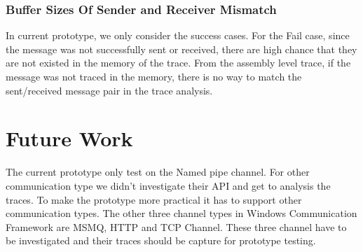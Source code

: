 \documentclass[paper=a4, fontsize=11pt]{scrartcl}
\numberwithin{equation}{section}		%
\numberwithin{figure}{section}			%
\numberwithin{table}{section}				%
\begin{document}
\subsubsection{Buffer Sizes Of Sender and Receiver Mismatch}
In current prototype, we only consider the success cases. For the Fail case, since the message was not successfully sent or received, there are high chance that they are not existed in the memory of the trace. From the assembly level trace, if the message was not traced in the memory, there is no way to match the sent/received message pair in the trace analysis. 

\section{Future Work}
The current prototype only test on the Named pipe channel. For other communication type we didn't investigate their API and get to analysis the traces. To make the prototype more practical it has to support other communication types. The other three channel types in Windows Communication Framework are MSMQ, HTTP and TCP Channel. These three channel have to be investigated and their traces should be capture for prototype testing.


 


\end{document}
